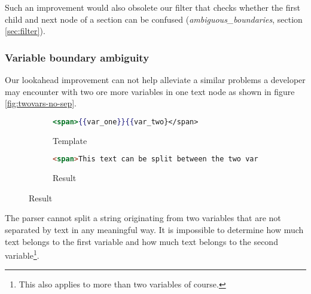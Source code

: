 \documentclass[thesis.tex]{subfiles}
\begin{document}
Such an improvement would also obsolete our filter that checks whether the
first child and next node of a section can be confused
(\emph{ambiguous\_boundaries}, section \ref{sec:filter}).

\subsubsection{Variable boundary ambiguity}
\label{sec:var-boundary-ambiguity}
Our lookahead improvement can not help alleviate a similar problems a developer
may encounter with two ore more variables in one text node as shown in figure 
\ref{fig:twovars-no-sep}.
\begin{figure}
	\centering
	\caption{Two variables without a separator between them}
	\label{fig:twovars-no-sep}
	\begin{subfigure}{\textwidth}
		\begin{lstlisting}[language=mustache]
<span>{{var_one}}{{var_two}</span>
		\end{lstlisting}
		\caption{Template}
		\label{fig:twovars-no-sep.mustache}
	\end{subfigure}
	
	\begin{subfigure}{\textwidth}
		\begin{lstlisting}[language=HTML]
<span>This text can be split between the two variables or belong to only one.</span>
		\end{lstlisting}
		\caption{Result}
		\label{fig:twovars-no-sep.html}
	\end{subfigure}
\end{figure}
The parser cannot split a string originating from two variables that are not
separated by text in any meaningful way. It is impossible to determine how much
text belongs to the first variable and how much text belongs to the second
variable\footnote{This also applies to more than two variables of course.}.
\end{document}
